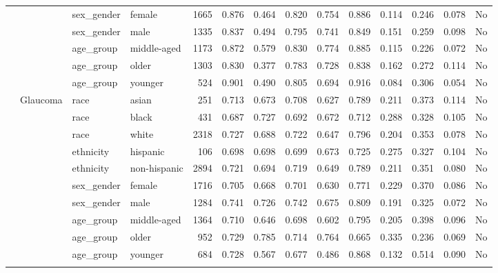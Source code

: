 \begin{longtable}{@{}lll l rrrrrrrr@{}}
 &  & sex\_gender & female & 1665 & 0.876 & 0.464 & 0.820 & 0.754 & 0.886 & 0.114 & 0.246 & 0.078 & No \\
 &  & sex\_gender & male & 1335 & 0.837 & 0.494 & 0.795 & 0.741 & 0.849 & 0.151 & 0.259 & 0.098 & No \\
 &  & age\_group & middle-aged & 1173 & 0.872 & 0.579 & 0.830 & 0.774 & 0.885 & 0.115 & 0.226 & 0.072 & No \\
 &  & age\_group & older & 1303 & 0.830 & 0.377 & 0.783 & 0.728 & 0.838 & 0.162 & 0.272 & 0.114 & No \\
 &  & age\_group & younger & 524 & 0.901 & 0.490 & 0.805 & 0.694 & 0.916 & 0.084 & 0.306 & 0.054 & No \\
 & Glaucoma & race & asian & 251 & 0.713 & 0.673 & 0.708 & 0.627 & 0.789 & 0.211 & 0.373 & 0.114 & No \\
 &  & race & black & 431 & 0.687 & 0.727 & 0.692 & 0.672 & 0.712 & 0.288 & 0.328 & 0.105 & No \\
 &  & race & white & 2318 & 0.727 & 0.688 & 0.722 & 0.647 & 0.796 & 0.204 & 0.353 & 0.078 & No \\
 &  & ethnicity & hispanic & 106 & 0.698 & 0.698 & 0.699 & 0.673 & 0.725 & 0.275 & 0.327 & 0.104 & No \\
 &  & ethnicity & non-hispanic & 2894 & 0.721 & 0.694 & 0.719 & 0.649 & 0.789 & 0.211 & 0.351 & 0.080 & No \\
 &  & sex\_gender & female & 1716 & 0.705 & 0.668 & 0.701 & 0.630 & 0.771 & 0.229 & 0.370 & 0.086 & No \\
 &  & sex\_gender & male & 1284 & 0.741 & 0.726 & 0.742 & 0.675 & 0.809 & 0.191 & 0.325 & 0.072 & No \\
 &  & age\_group & middle-aged & 1364 & 0.710 & 0.646 & 0.698 & 0.602 & 0.795 & 0.205 & 0.398 & 0.096 & No \\
 &  & age\_group & older & 952 & 0.729 & 0.785 & 0.714 & 0.764 & 0.665 & 0.335 & 0.236 & 0.069 & No \\
 &  & age\_group & younger & 684 & 0.728 & 0.567 & 0.677 & 0.486 & 0.868 & 0.132 & 0.514 & 0.090 & No \\
\botrule
\end{longtable}
\endgroup
